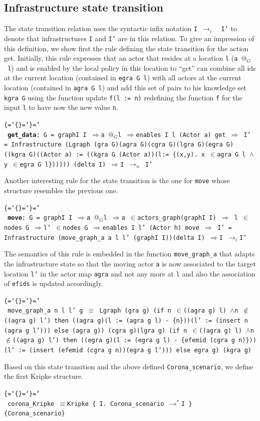 \documentclass{llncs}
\makeatletter
\newenvironment{ttbox}{\begin{alltt}\ttbraces\small\tt}%
                      {\end{alltt}}
\def\ttbraces{\let\.=\nobreak\chardef\{=`\{\chardef\}=`\}\chardef\|=`\\}
\newcommand\ttand{\mbox{{$\land$}}}
\newcommand\ttequiv{\mbox{{$\equiv$}}}
\newcommand\ttin{\mbox{{$\in$}}}
\newcommand\ttnin{\mbox{{$\notin$}}}
\newcommand\ttImp{\mbox{{$\Longrightarrow$}}}
\newcommand\ttatI{\mbox{\( @_G \)}}
\newcommand\ttrelI{\mbox{{$\to_{i}$}}}
\newcommand\ttrelIstar{\mbox{{$\to^*$}}}
\newcommand\ttrel[1]{\mbox{{$\to_{#1}$}}}
\makeatother
\begin{document}
\subsection{Infrastructure state transition}
\label{sec:statetrans}
The state transition relation uses the syntactic infix notation 
\texttt{I \ttrelI\, I'}  to denote that infrastructures 
\texttt{I} and \texttt{I'} are in this relation.
To give an impression of this definition, we show first the rule defining the state transition for
the action get. Initially, this rule expresses that
an actor that resides at a location \texttt{l} (\texttt{a \ttatI\ l})
and is enabled by the local policy in this location to ``get'' can
combine  all ids at the current location (contained in \texttt{egra G l}) with
all actors at the current location (contained in \texttt{agra G l}) and add this
set of pairs to his knowledge set \texttt{kgra G} using the function update \texttt{f(l := n)}
redefining the function \texttt{f} for the input \texttt{l} to have now the new value \texttt{n}.
\begin{ttbox}
 {\bf{get\_data}}: G = graphI I \ttImp a \ttatI l \ttImp enables I l (Actor a) get \ttImp 
   I' = Infrastructure 
          (Lgraph (gra G)(agra G)(cgra G)(lgra G)(egra G)
            ((kgra G)((Actor a) := ((kgra G (Actor a))(l:=
                 \{(x,y). x \ttin agra G l \ttand y \ttin egra G l\})))))
          (delta I)
   \ttImp I \ttrel{n} I' 
\end{ttbox}
Another interesting rule for the state transition is the one for \texttt{move} whose structure
resembles the previous one.
\begin{ttbox}
 {\bf{move}}: G = graphI I \ttImp a \ttatI l \ttImp a \ttin actors_graph(graphI I) \ttImp
    l \ttin nodes G \ttImp l' \ttin nodes G \ttImp enables I l' (Actor h) move \ttImp
    I' = Infrastructure (move_graph_a a l l' (graphI I))(delta I)
 \ttImp I \ttrelI I' 
\end{ttbox}
The semantics of this rule is embedded in the function \texttt{move\_graph\_a}
that adapts the infrastructure state so that the moving actor \texttt{a} is now
associated to the target location \texttt{l'} in the actor map \texttt{agra} and not
any more at \texttt{l} and also the association of \texttt{efids} is updated accordingly.
\begin{ttbox}
move_graph_a n l l' g \ttequiv
  Lgraph (gra g) 
         (if n \ttin ((agra g) l) \ttand  n \ttnin ((agra g) l') then 
           ((agra g)(l := (agra g l) - \{n\}))(l' := (insert n (agra g l')))
          else (agra g))
         (cgra g)(lgra g)
         (if n \ttin ((agra g) l) \ttand  n \ttnin ((agra g) l') then
               ((egra g)(l := (egra g l) - \{efemid (cgra g n)\}))
                        (l' := (insert (efemid (cgra g n))(egra g l')))
          else egra g)
         (kgra g)
\end{ttbox}  
Based on this state transition and the above defined \texttt{Corona\_scenario}, we define the first Kripke structure.
\begin{ttbox}
 corona_Kripke \ttequiv Kripke \{ I. Corona_scenario \ttrelIstar I \} \{Corona_scenario\}
\end{ttbox}
\end{document}
